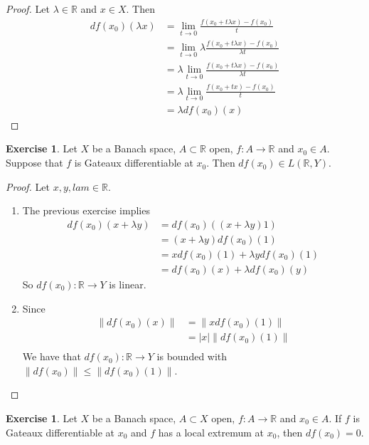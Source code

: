 \documentclass[12pt]{amsart}
\theoremstyle{definition}
\newtheorem{ex}[definition]{Exercise}
\newcommand{\lam}{\lambda}
\newcommand{\R}{\mathbb{R}}
\begin{document}
	\begin{proof}
	Let $\lam \in \R$ and $x \in X$. Then 
	\begin{align*}
	df(x_0)(\lam x) 
	&= \lim_{t \rightarrow 0} \frac{f(x_0 + t \lam x) - f(x_0)}{t} \\
	&= \lim_{t \rightarrow 0} \lam \frac{f(x_0 + t \lam x) - f(x_0)}{\lam t} \\
	&= \lam \lim_{t \rightarrow 0}  \frac{f(x_0 + t \lam x) - f(x_0)}{\lam t} \\
	&= \lam \lim_{t \rightarrow 0}  \frac{f(x_0 + t x) - f(x_0)}{t} \\
	&= \lam df(x_0)(x) 
	\end{align*}
	\end{proof}
	
	\begin{ex}
	Let $X$ be a Banach space, $A \subset \R$ open, $f:A \rightarrow \R$ and $x_0 \in A$. Suppose that $f$ is Gateaux differentiable at $x_0$. Then $df(x_0) \in L(\R,Y)$.
	\end{ex}
	
	\begin{proof}
	Let $x,y ,lam \in \R$. 
	\begin{enumerate}
	\item The previous exercise implies 
	\begin{align*}
	df(x_0)(x + \lam y) 
	&= df(x_0)((x+\lam y)1)  \\
	&= (x+\lam y)df(x_0)(1) \\
	&= xdf(x_0)(1) + \lam y df(x_0)(1) \\
	&= df(x_0)(x) + \lam df(x_0)(y)
	\end{align*}
	So $df(x_0):\R \rightarrow Y$ is linear.
	\item Since 
	\begin{align*}
	\|df(x_0)(x)\| 
	&= \|xdf(x_0)(1)\| \\
	&= |x| \|df(x_0)(1)\| \\
	\end{align*}	
	We have that $df(x_0):\R \rightarrow Y$ is bounded with $\|df(x_0)\| \leq \|df(x_0)(1)\|$. 
	\end{enumerate}
	\end{proof}
	
	\begin{ex}
	Let $X$ be a Banach space, $A \subset X$ open, $f:A \rightarrow \R$ and $x_0 \in A$. If $f$ is Gateaux differentiable at $x_0$ and $f$ has a local extremum at $x_0$, then $df(x_0) = 0$.
	\end{ex}	
	
\end{document}
